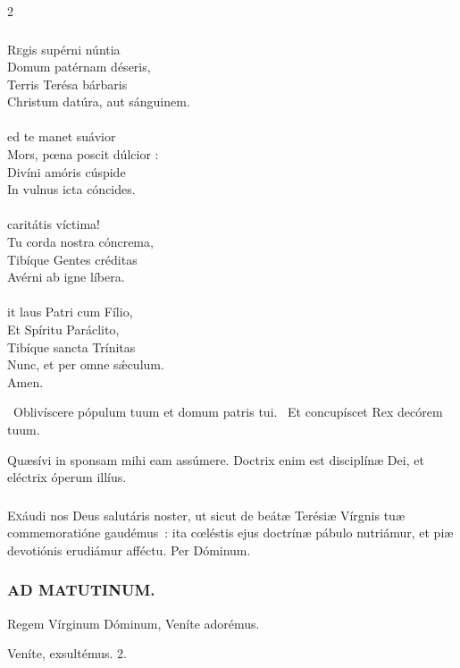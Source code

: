 \documentclass[9pt,twoside]{extarticle}
\begin{document}
\begin{multicols}{2}
{{\subsubsection*{\center {}}
\begin{center}\end{center}
\lettrine{R}egis supérni núntia\\
Domum patérnam déseris,\\
Terris Terésa bárbaris\\
Christum datúra, aut sánguinem.\\
\\
ed te manet suávior\\
Mors, pœna poscit dúlcior :\\
Divíni amóris cúspide\\
In vulnus icta cóncides.\\
\\
 caritátis víctima!\\
Tu corda nostra cóncrema,\\
Tibíque Gentes créditas\\
Avérni ab igne líbera.\\
\\
it laus Patri cum Fílio,\\
Et Spíritu Paráclito,\\
Tibíque sancta Trínitas\\
Nunc, et per omne sǽculum.\\
Amen.

\begin{tightlist}{}
\item {}~Oblivíscere pópulum tuum et domum patris tui. ~Et concupíscet Rex decórem tuum.
\item {} Quæsívi in sponsam mihi eam assúmere. Doctrix enim est disciplínæ Dei, et eléctrix óperum illíus.
\end{tightlist}

\subsubsection*{\center {}}
\lettrine{E}xáudi nos Deus salutáris noster, ut sicut de beátæ Terésiæ Vírgnis tuæ commemoratióne gaudémus~: ita cœléstis ejus doctrínæ pábulo nutriámur, et piæ devotiónis erudiámur afféctu. Per Dóminum.

\subsubsection*{\center \textsc{AD MATUTINUM.}}
\begin{tightlist}{}
\item {} Regem Vírginum Dóminum, \textred{*} Veníte adorémus.
\item {} Veníte, exsultémus. 2.
\item {}
\end{tightlist}

}}
\end{multicols}
\end{document}
